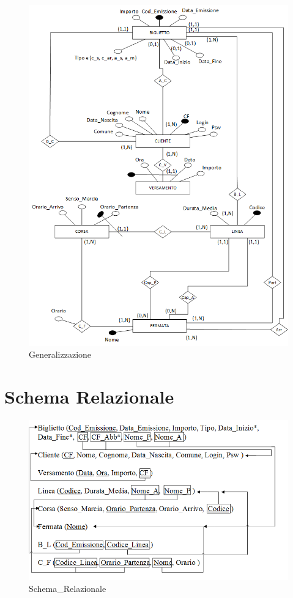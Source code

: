 \documentclass[a4paper,11pt]{book}
\begin{document}
\begin{figure}[!ht]
\centering
\includegraphics[scale = 0.8]{Generalizzazione.png}
\caption{Generalizzazione}
\end{figure}

\chapter{Schema Relazionale}

\begin{figure}[!ht]
\centering
\includegraphics[scale = 0.8]{Schema_Relazionale.png}
\caption{Schema\_Relazionale}
\end{figure}
\end{document}
